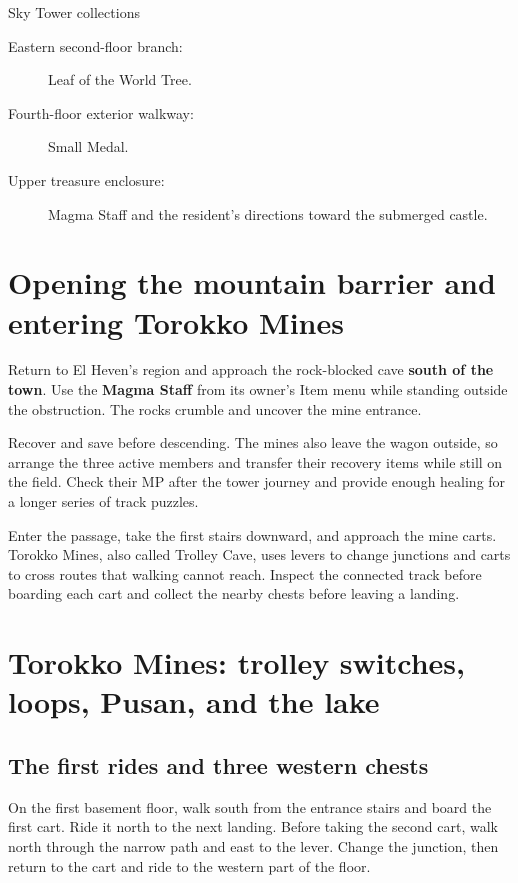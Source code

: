 \begin{routecheck}{Sky Tower collections}
\begin{description}
  \item[Eastern second-floor branch:] Leaf of the World Tree.
  \item[Fourth-floor exterior walkway:] Small Medal.
  \item[Upper treasure enclosure:] Magma Staff and the resident's
    directions toward the submerged castle.
\end{description}
\end{routecheck}

\section{Opening the mountain barrier and entering Torokko Mines}

Return to El Heven's region and approach the rock-blocked cave
\textbf{south of the town}. Use the \textbf{Magma Staff}
from its owner's Item menu while standing outside the obstruction.
The rocks crumble and uncover the mine entrance.

Recover and save before descending. The mines also leave the
wagon outside, so arrange the three active members and transfer
their recovery items while still on the field. Check their MP
after the tower journey and provide enough healing for a longer
series of track puzzles.

Enter the passage, take the first stairs downward, and approach
the mine carts. Torokko Mines, also called Trolley Cave, uses
levers to change junctions and carts to cross routes that walking
cannot reach. Inspect the connected track before boarding each
cart and collect the nearby chests before leaving a landing.

\section{Torokko Mines: trolley switches, loops, Pusan, and the lake}

\subsection*{The first rides and three western chests}

On the first basement floor, walk south from the entrance stairs
and board the first cart. Ride it north to the next landing.
Before taking the second cart, walk north through the narrow path
and east to the lever. Change the junction, then return to the
cart and ride to the western part of the floor.

